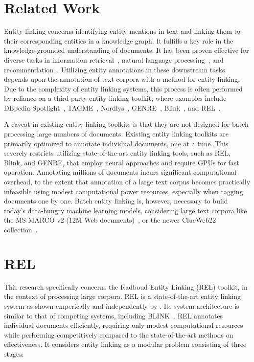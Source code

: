 \section{Related Work}
Entity linking concerns identifying entity mentions in text and linking them to their corresponding entities in a knowledge graph. It fulfills a key role in the knowledge-grounded understanding of documents. It has been proven effective for diverse tasks in information retrieval~\citep{Gerritse:2022:EMBERT, Gerritse:2020:GEER, doc-ranking-entity, el-ranking-hasibi, el-balog, query-recommendation-entity, chatterjee2022bert}, natural language processing~\citep{lin-etal-2012-entity, watson}, and recommendation~\citep{yang-etal-2018-collective}.
Utilizing entity annotations in these downstream tasks depends upon the annotation of text corpora with a method for entity linking. Due to the complexity of entity linking systems, this process is often performed by reliance on a third-party entity linking toolkit, where examples include DBpedia Spotlight~\citep{dbpedia-spotlight}, TAGME~\citep{tagme}, Nordlys~\citep{nordlys}, GENRE~\citep{genre}, Blink~\citep{blink}, and REL~\citep{rel}.

A caveat in existing entity linking toolkits is that they are not designed for batch processing large numbers of documents. Existing entity linking toolkits are primarily optimized to annotate individual documents, one at a time. This severely restricts utilizing state-of-the-art entity linking tools, such as REL, Blink, and GENRE, that employ neural approaches and require GPUs for fast operation. Annotating millions of documents incurs significant computational overhead, to the extent that annotation of a large text corpus becomes practically infeasible using modest computational power resources, especially when tagging documents one by one. Batch entity linking is, however, necessary to build today's data-hungry machine learning models, considering large text corpora like the MS MARCO v2 (12M Web documents)~\citep{msmarco}, or the newer ClueWeb22 collection~\citep{clueweb22}.

\section{REL}
This research specifically concerns the Radboud Entity Linking (REL) toolkit, in the context of processing large corpora. REL is a state-of-the-art entity linking system as shown emperically and independently by \citet{bast-etal-2023-fair}. Its system architecture is similar to that of competing systems, including BLINK~\citep{blink}.
REL annotates individual documents efficiently, requiring only modest computational resources while performing competitively compared to the state-of-the-art methods on effectiveness. It considers entity linking as a modular problem consisting of three stages:

